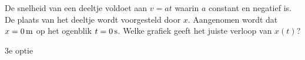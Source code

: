 
\begin{exercise}


De snelheid van een deeltje voldoet aan $v=at$ waarin $a$ constant en negatief is. De plaats van het deeltje wordt voorgesteld door $x$. Aangenomen wordt dat $x=0\rm\,m$ op het ogenblik $t=0\rm\,s$. Welke grafiek geeft het juiste verloop van $x(t)$?
\begin{figure}[h]
\begin{flushright}
\end{flushright}
\end{figure}

\begin{oplossing}
3e optie
\end{oplossing}


\end{exercise}
